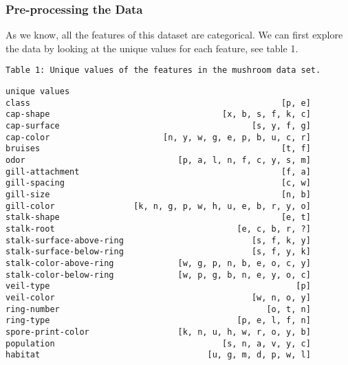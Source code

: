 \documentclass[11pt]{article}
\makeatletter
\newcommand{\boxspacing}{\kern\kvtcb@left@rule\kern\kvtcb@boxsep}
\makeatother
\begin{document}
    \hypertarget{pre-processing-the-data}{%
\subsubsection{Pre-processing the Data}\label{pre-processing-the-data}}


    As we know, all the features of this dataset are categorical. We can
first explore the data by looking at the unique values for each feature,
see table 1.

    \begin{Verbatim}[commandchars=\\\{\}]
Table 1: Unique values of the features in the mushroom data set.
    \end{Verbatim}

            \begin{tcolorbox}[breakable, size=fbox, boxrule=.5pt, pad at break*=1mm, opacityfill=0]
{\boxspacing}
\begin{Verbatim}[commandchars=\\\{\}]
                                                 unique values  
class                                                   [p, e]
cap-shape                                   [x, b, s, f, k, c]
cap-surface                                       [s, y, f, g]
cap-color                       [n, y, w, g, e, p, b, u, c, r]
bruises                                                 [t, f]
odor                               [p, a, l, n, f, c, y, s, m]
gill-attachment                                         [f, a]
gill-spacing                                            [c, w]
gill-size                                               [n, b]
gill-color                [k, n, g, p, w, h, u, e, b, r, y, o]
stalk-shape                                             [e, t]
stalk-root                                     [e, c, b, r, ?]
stalk-surface-above-ring                          [s, f, k, y]
stalk-surface-below-ring                          [s, f, y, k]
stalk-color-above-ring             [w, g, p, n, b, e, o, c, y]
stalk-color-below-ring             [w, p, g, b, n, e, y, o, c]
veil-type                                                  [p]
veil-color                                        [w, n, o, y]
ring-number                                          [o, t, n]
ring-type                                      [p, e, l, f, n]
spore-print-color                  [k, n, u, h, w, r, o, y, b]
population                                  [s, n, a, v, y, c]
habitat                                  [u, g, m, d, p, w, l]
\end{Verbatim}
\end{tcolorbox}
        
\end{document}
